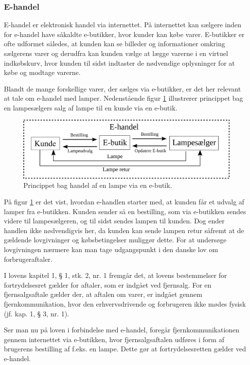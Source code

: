 \subsubsection{E-handel}
\label{sec:ehandel}
E-handel er elektronisk handel via internettet\cite{ddo_ehandel}. På internettet kan sælgere inden for e-handel have såkaldte e-butikker, hvor kunder kan købe varer\cite{ddo_ebutik}. E-butikker er ofte udformet således, at kunden kan se billeder og informationer omkring sælgerens varer og derudfra kan kunden vælge at lægge varerne i en virtuel indkøbskurv, hvor kunden til sidst indtaster de nødvendige oplysninger for at købe og modtage varerne.

Blandt de mange forskellige varer, der sælges via e-butikker, er det her relevant at tale om e-handel med lamper. Nedenstående figur \ref{fig:e_handel_med_lamper} illustrerer princippet bag en lampesælgers salg af lampe til en kunde via en e-butik.
\begin{figure}[H]
	\includegraphics{e_handel_med_lampe}
	\caption{Princippet bag handel af en lampe via en e-butik.}
    \label{fig:e_handel_med_lamper}
\end{figure}

På figur \ref{fig:e_handel_med_lamper} er det vist, hvordan e-handlen starter med, at kunden får et udvalg af lamper fra e-butikken. Kunden sender så en bestilling, som via e-butikken sendes videre til lampesælgeren, og til sidst sendes lampen til kunden. Dog ender handlen ikke nødvendigvis her, da kunden kan sende lampen retur såfremt at de gældende lovgivninger og købsbetingelser muliggør dette. For at undersøge lovgivningen nærmere kan man tage udgangspunkt i den danske lov om forbrugeraftaler\cite{retsinformationen}.

I lovens kapitel 1, § 1, stk. 2, nr. 1 fremgår det, at lovens bestemmelser for fortrydelsesret gælder for aftaler, som er indgået ved fjernsalg. For en  fjernsalgsaftale gælder der, at aftalen om varer, er indgået gennem fjernkommunikation, hvor den erhvervsdrivende og forbrugeren ikke mødes fysisk (jf. kap. 1, § 3, nr. 1).

Ser man nu på loven i forbindelse med e-handel, foregår fjernkommunikationen gennem internettet via e-butikken, hvor fjernsalgsaftalen udføres i form af brugerens bestilling af f.eks. en lampe. Dette gør at fortrydelsesretten gælder ved e-handel.

